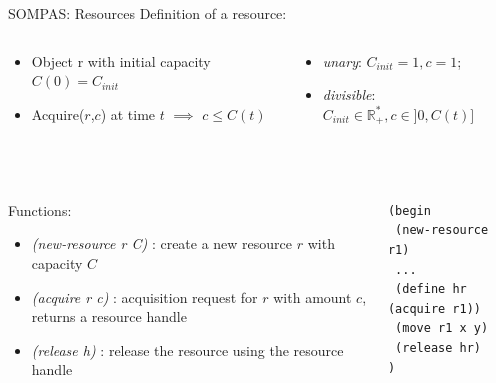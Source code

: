 \begin{frame}[fragile]{SOMPAS: Resources}
    Definition of a resource:
    \begin{columns}
        \begin{column}{0.5\textwidth}
            \begin{itemize}
                \item Object r with initial capacity $C(0) = C_{init} $
                \item Acquire($r$,$c$) at time $t$ $\implies$ $c \leq C(t)$ 
            \end{itemize}
        \end{column}
        \begin{column}{0.5\textwidth}
            \begin{itemize}
                \item \emph{unary}: $C_{init} = 1, c = 1$;
                \item \emph{divisible}: $C_{init} \in  \mathbb{R}_+^*, c \in ]0, C(t)]$
            \end{itemize}
        \end{column}
    \end{columns}
    
    ~~


    \begin{columns}
        \begin{column}{0.6\textwidth}
            Functions:
            \begin{itemize}
                \item \textit{(new-resource r C)} : create a new resource $r$ with capacity $C$
                \item \emph{(acquire r c)} : acquisition request for $r$ with amount $c$, returns a resource handle
                \item \emph{(release h)} : release the resource using the resource handle
            \end{itemize}
        \end{column}
        \begin{column}{0.4\textwidth}
            \small
            \lstset{columns=fullflexible}
            \begin{lstlisting}
(begin
 (new-resource r1)
 ...
 (define hr (acquire r1))
 (move r1 x y)
 (release hr)
)
            \end{lstlisting}
        \end{column}
    \end{columns}


\end{frame}

